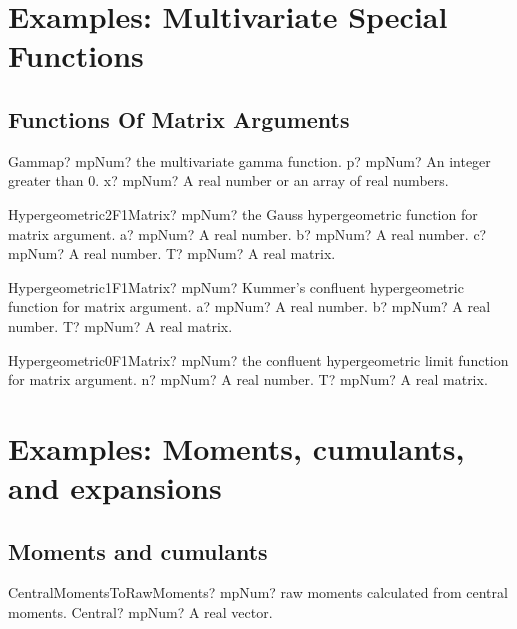 \documentclass[12pt,a4paper,openany]{book}
\begin{document}
\chapter{Examples: Multivariate Special Functions}

\section{Functions Of Matrix Arguments}

\begin{mpFunctionsExtract}
\mpFunctionTwoNotImplemented
{Gammap? mpNum? the multivariate gamma function.}
{p? mpNum? An integer greater than 0.}
{x? mpNum? A real number or an array of real numbers.}
\end{mpFunctionsExtract}

\begin{mpFunctionsExtract}
\mpFunctionFourNotImplemented
{Hypergeometric2F1Matrix? mpNum? the Gauss hypergeometric function for matrix argument.}
{a? mpNum? A real number.}
{b? mpNum? A real number.}
{c? mpNum? A real number.}
{T? mpNum? A real matrix.}
\end{mpFunctionsExtract}

\begin{mpFunctionsExtract}
\mpFunctionThreeNotImplemented
{Hypergeometric1F1Matrix? mpNum? Kummer's confluent hypergeometric function  for matrix argument.}
{a? mpNum? A real number.}
{b? mpNum? A real number.}
{T? mpNum? A real matrix.}
\end{mpFunctionsExtract}

\begin{mpFunctionsExtract}
\mpFunctionTwoNotImplemented
{Hypergeometric0F1Matrix? mpNum? the confluent hypergeometric limit function for matrix argument.}
{n? mpNum? A real number.}
{T? mpNum? A real matrix.}
\end{mpFunctionsExtract}

\chapter{Examples: Moments, cumulants, and expansions}

\section{Moments and cumulants}

\begin{mpFunctionsExtract}
\mpFunctionOneNotImplemented
{CentralMomentsToRawMoments? mpNum? raw moments calculated from central moments.}
{Central? mpNum? A real vector.}
\end{mpFunctionsExtract}
\end{document}
